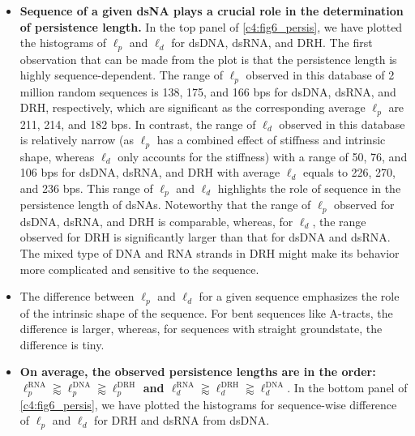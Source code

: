 \begin{itemize}
    \item \textbf{Sequence of a given dsNA plays a crucial role in the determination of persistence length.} 
    In the top panel of \cref{c4:fig6_persis}, we have plotted the histograms of $\ell_{p}$ and $\ell_{d}$ for dsDNA, dsRNA, and DRH.
The first observation that can be made from the plot is that the persistence length is highly sequence-dependent.
The range of $\ell_{p}$ observed in this database of 2 million random sequences is 138, 175, and 166 bps for dsDNA, dsRNA, and DRH, respectively, which are significant as the corresponding average $\ell_{p}$ are 211, 214, and 182 bps.
In contrast, the range of $\ell_{d}$ observed in this database is relatively narrow (as $\ell_{p}$ has a combined effect of stiffness and intrinsic shape, whereas $\ell_{d}$ only accounts for the stiffness) with a range of 50, 76, and 106 bps for dsDNA, dsRNA, and DRH with average $\ell_{d}$ equals to 226, 270, and 236 bps.
This range of $\ell_{p}$ and $\ell_{d}$ highlights the role of sequence in the persistence length of dsNAs. 
Noteworthy that the range of $\ell_p$ observed for dsDNA, dsRNA, and DRH is comparable, whereas, for $\ell_d$, the range observed for DRH is significantly larger than that for dsDNA and dsRNA.
The mixed type of DNA and RNA strands in DRH might make its behavior more complicated and sensitive to the sequence.
\item The difference between $\ell_{p}$ and $\ell_{d}$ for a given sequence emphasizes the role of the intrinsic shape of the sequence. For bent sequences like A-tracts, the difference is larger, whereas, for sequences with straight groundstate, the difference is tiny. 
\item \textbf{On average, the observed persistence lengths are in the order:
$\ell_{p}^{\text{RNA}} \gtrapprox \ell_{p}^{\text{DNA}} \gtrapprox \ell_{p}^{\text{DRH}}$  and 
$\ell_{d}^{\text{RNA}} \gtrapprox \ell_{d}^{\text{DRH}} \gtrapprox \ell_{d}^{\text{DNA}}$}. In the bottom panel of \cref{c4:fig6_persis}, we have plotted the histograms for  sequence-wise difference of $\ell_{p}$ and $\ell_{d}$ 
for DRH and dsRNA from dsDNA. 
\end{itemize}

